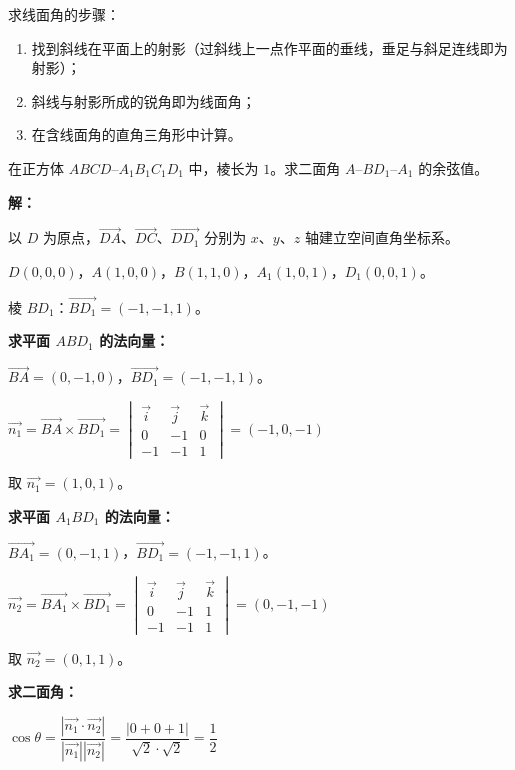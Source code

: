 \documentclass[12pt, a4paper]{ctexart}
\begin{document}
\begin{tipbox}[方法总结]
求线面角的步骤：
\begin{enumerate}[leftmargin=2em]
  \item 找到斜线在平面上的射影（过斜线上一点作平面的垂线，垂足与斜足连线即为射影）；
  \item 斜线与射影所成的锐角即为线面角；
  \item 在含线面角的直角三角形中计算。
\end{enumerate}
\end{tipbox}

\vspace{6pt}

\begin{examplebox}[【例题8】二面角的计算]
在正方体 $ABCD$--$A_1B_1C_1D_1$ 中，棱长为 $1$。求二面角 $A$--$BD_1$--$A_1$ 的余弦值。
\end{examplebox}

\textbf{解：}

以 $D$ 为原点，$\vec{DA}$、$\vec{DC}$、$\vec{DD_1}$ 分别为 $x$、$y$、$z$ 轴建立空间直角坐标系。

$D(0,0,0)$，$A(1,0,0)$，$B(1,1,0)$，$A_1(1,0,1)$，$D_1(0,0,1)$。

棱 $BD_1$：$\vec{BD_1} = (-1,-1,1)$。

\textbf{求平面 $ABD_1$ 的法向量：}

$\vec{BA} = (0,-1,0)$，$\vec{BD_1} = (-1,-1,1)$。

$\vec{n_1} = \vec{BA} \times \vec{BD_1} = \begin{vmatrix} \vec{i} & \vec{j} & \vec{k} \\ 0 & -1 & 0 \\ -1 & -1 & 1 \end{vmatrix} = (-1, 0, -1)$

取 $\vec{n_1} = (1, 0, 1)$。

\textbf{求平面 $A_1BD_1$ 的法向量：}

$\vec{BA_1} = (0,-1,1)$，$\vec{BD_1} = (-1,-1,1)$。

$\vec{n_2} = \vec{BA_1} \times \vec{BD_1} = \begin{vmatrix} \vec{i} & \vec{j} & \vec{k} \\ 0 & -1 & 1 \\ -1 & -1 & 1 \end{vmatrix} = (0, -1, -1)$

取 $\vec{n_2} = (0, 1, 1)$。

\textbf{求二面角：}

$\cos \theta = \dfrac{|\vec{n_1} \cdot \vec{n_2}|}{|\vec{n_1}||\vec{n_2}|} = \dfrac{|0 + 0 + 1|}{\sqrt{2} \cdot \sqrt{2}} = \dfrac{1}{2}$
\end{document}
